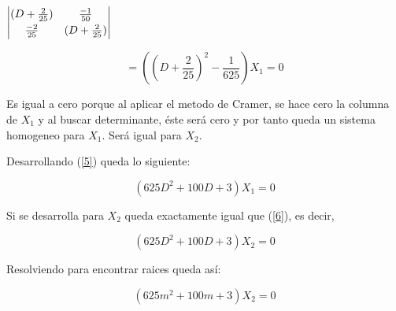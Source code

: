 \documentclass[titlepage]{article}
\begin{document}
                \begin{center}
                    $\begin{vmatrix}
                    
                        (D +  \frac {2}{25}) & \frac{-1}{50}\vspace{0.1cm} \\
                        \frac{-2}{25} & (D + \frac{2}{25})
                        
                    \end{vmatrix}\vspace{0.4cm}$
                    
                    
                \end{center}
                    \begin{equation}
                        = ((D + \frac{2}{25})^2 - \frac{1}{625})X_1 = 0
                        \label{5}
                    \end{equation}
                    
                Es igual a cero porque al aplicar el metodo de Cramer, se hace cero la columna de $X_1$ y al buscar determinante, éste será cero y por tanto queda un sistema homogeneo para $X_1$. Será igual para $X_2$.
                
                Desarrollando (\ref{5}) queda lo siguiente:
                
                    \begin{equation}
                        (625D^2 + 100D +3)X_1 = 0
                        \label{6}
                    \end{equation}\vspace{0.2cm}
                    
                Si se desarrolla para $X_2$ queda exactamente igual que (\ref{6}), es decir,
                
                    \begin{equation}
                        (625D^2 + 100D +3)X_2 = 0
                        \label{7}
                    \end{equation}\vspace{0.2cm}
                
                Resolviendo para encontrar raices queda así:
                    
                    \begin{equation*}
                        (625m^2 + 100m +3)X_2 = 0
                    \end{equation*}\vspace{0.2cm}
                    
\end{document}
